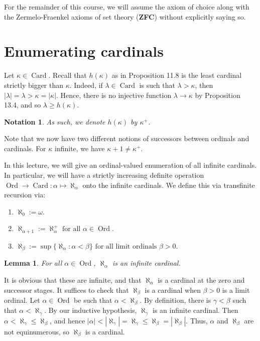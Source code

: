 \documentclass[10pt]{article}
\makeatletter
\DeclareMathOperator{\Ord}{Ord}
\DeclareMathOperator{\Card}{Card}
\theoremstyle{newstyle}
\newtheorem{lemma}[thm]{Lemma}
\newtheorem{notation}[thm]{Notation}
\newenvironment{pf}[1][\proofname]{\par
  \pushQED{\qed}%
  \normalfont \topsep0\p@\relax
  \trivlist
  \item[\hskip\labelsep\scshape
  #1\@addpunct{.}]\ignorespaces
}{%
  \popQED\endtrivlist\@endpefalse
}
\makeatother
\begin{document}
For the remainder of this course, we will assume the axiom of choice along with 
the Zermelo-Fraenkel axioms of set theory ({\bf ZFC}) without explicitly saying so. 

 
\newpage\section{Enumerating cardinals}

Let $\kappa \in \Card$. Recall that $h(\kappa)$ as in Proposition 11.8 is the least 
cardinal strictly bigger than $\kappa$. Indeed, if $\lambda \in \Card$ is such that 
$\lambda > \kappa$, then $|\lambda| = \lambda > \kappa = |\kappa|$. Hence, there 
is no injective function $\lambda \to \kappa$ by Proposition 13.4, and so 
$\lambda \geq h(\kappa)$. 

\begin{notation} As such, we denote $h(\kappa)$ by $\kappa^+$. \end{notation}

Note that we now have two different notions of successors between ordinals and cardinals. 
For $\kappa$ infinite, we have $\kappa + 1 \neq \kappa^+$. 

In this lecture, we will give an ordinal-valued enumeration of all infinite cardinals. 
In particular, we will have a strictly increasing definite operation 
$\Ord \to \Card : \alpha \mapsto \aleph_\alpha$
onto the infinite cardinals. We define this via transfinite recursion via:
\begin{enumerate}[(1)]
    \item $\aleph_0 := \omega$.
    \item $\aleph_{\alpha+1} := \aleph_\alpha^+ \text{ for all } \alpha \in \Ord$.
    \item $\aleph_\beta := \sup\{\aleph_\alpha : \alpha < \beta\} \text{ for all limit ordinals } \beta > 0.$
\end{enumerate}

\begin{lemma}
For all $\alpha \in \Ord$, $\aleph_\alpha$ is an infinite cardinal.
\end{lemma}
\begin{pf}
It is obvious that these are infinite, and that $\aleph_\alpha$ is a cardinal at the 
zero and successor stages. It suffices to check that $\aleph_\beta$ is a cardinal 
when $\beta > 0$ is a limit ordinal. Let $\alpha \in \Ord$ be such that 
$\alpha < \aleph_\beta$. By definition, there is $\gamma < \beta$ such that 
$\alpha < \aleph_\gamma$. By our inductive hypothesis, $\aleph_\gamma$ is an infinite cardinal. 
Then $\alpha < \aleph_\gamma \leq \aleph_\beta$, and hence $|\alpha| < 
|\aleph_\gamma| = \aleph_\gamma \leq \aleph_\beta = |\aleph_\beta|$. Thus, 
$\alpha$ and $\aleph_\beta$ are not equinumerous, so $\aleph_\beta$ is a cardinal.
\end{pf}
\end{document}
